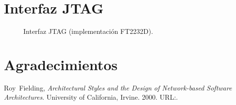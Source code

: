 \documentclass[conference]{IEEEtran}
\begin{document}
\section{Interfaz JTAG}
\label{sec:jtag}

\lipsum[45-48]

\begin{figure}[!t]
  \centerline{
  \hfil
  \hfil
  }
  \caption{Interfaz JTAG (implementación FT2232D).}
  \label{fig:oocdlink}
\end{figure}

\section*{Agradecimientos}

\lipsum[75-80]

\begin{thebibliography}{1}


  Roy~Fielding, \emph{Architectural Styles and the Design of
    Network-based Software Architectures}. University of California,
  Irvine. 2000. URL:.

\end{thebibliography}

\end{document}
